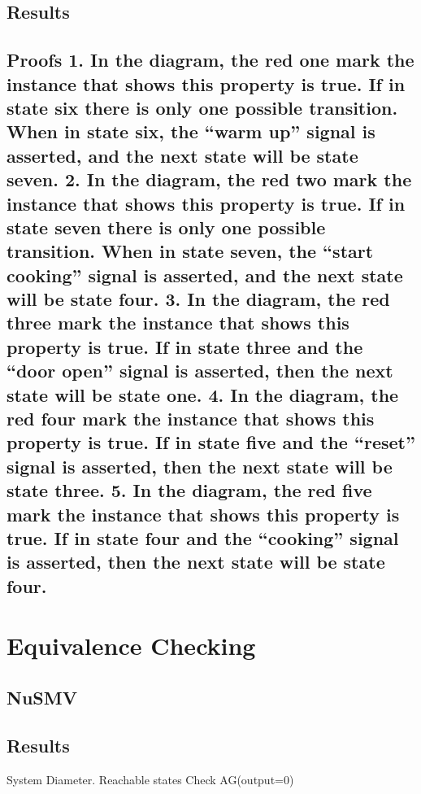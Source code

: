 \documentclass[11pt]{article}
\begin{document}
	\subsection{Results}
	\subsection{Proofs
1. In the diagram, the red one mark the instance that shows this property is true. If in state six there is only one possible transition. When in state six, the “warm up” signal is asserted, and the next state will be state seven.
2. In the diagram, the red two mark the instance that shows this property is true. If in state seven there is only one possible transition. When in state seven, the “start cooking” signal is asserted, and the next state will be state four.
3. In the diagram, the red three mark the instance that shows this property is true. If in state three and the “door open” signal is asserted, then the next state will be state one.
4. In the diagram, the red four mark the instance that shows this property is true.  If in state five and the “reset” signal is asserted, then the next state will be state three.
5. In the diagram, the red five mark the instance that shows this property is true.  If in state four and the “cooking” signal is asserted, then the next state will be state four.
	}
%

\section{Equivalence Checking} 
\subsection{NuSMV}
\subsection{Results}
System Diameter.
Reachable states
Check AG(output=0)

%  
\end{document}
